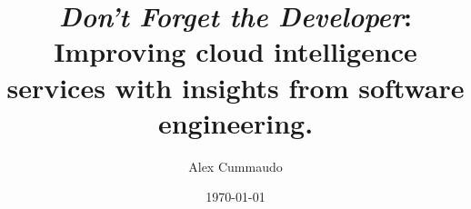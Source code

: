 \title{\textit{Don't Forget the Developer}:\\Improving cloud intelligence services with insights from software engineering.}
\author{Alex Cummaudo}
\date{\today}

\def \thedegree {Doctor of Philosophy}
\def \thedepartment {Applied Artificial Intelligence Institute}
\def \theinstitution {Deakin University}
\def \thelocation {Melbourne, Australia}
\def \theauthorspostnominals {BSc \textit{Swinburne}, BIT(Hons)}
